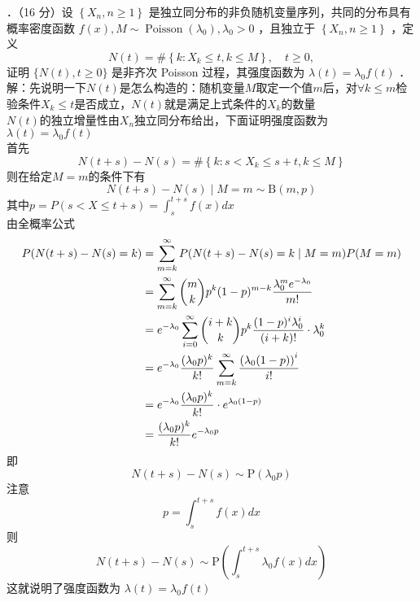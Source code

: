 \documentclass[UTF8,openany]{book}
\begin{document}
．（16 分）设 $\left\{X_{n}, n \geq 1\right\}$ 是独立同分布的非负随机变量序列，共同的分布具有概率密度函数 $f(x), M \sim \operatorname{Poisson}\left(\lambda_{0}\right), \lambda_{0}>0$ ，且独立于 $\left\{X_{n}, n \geq 1\right\}$ ，定义
$$
N(t)=\#\left\{k: X_{k} \leq t, k \leq M\right\}, \quad t \geq 0,
$$
证明 $\{N(t), t \geq 0\}$ 是非齐次 Poisson 过程，其强度函数为 $\lambda(t)=\lambda_{0} f(t)$ ．\\
解：先说明一下$N(t)$是怎么构造的：随机变量$M$取定一个值$m$后，对$\forall k \le m$检验条件$X_k \le t$是否成立，$N(t)$就是满足上式条件的$X_k$的数量\\
$N(t)$的独立增量性由$X_n$独立同分布给出，下面证明强度函数为 $\lambda(t)=\lambda_{0} f(t)$\\
首先
\[
N(t+s)-N(s)=\# \left\{k:s< X_{k} \leq s+t, k \leq M\right\}
\]
则在给定$M=m$的条件下有
\[
N(t+s)-N(s) \mid M=m \sim \mathrm{B}(m,p)
\]
其中$p=P(s<X\le t+s)=\int_{s}^{t+s} f(x)dx $\\
由全概率公式
\begin{align*}
	P(N(t+s)-N(s)=k) & = \sum\limits_{m=k}^{\infty}P(N(t+s)-N(s)=k\mid M=m)P(M=m)  \\
	&= \sum\limits_{m=k}^{\infty} \dbinom{m}{k} p^k (1-p)^{m-k}\frac{\lambda_0^m e^{-\lambda_0}}{m!}\\
	&=e^{-\lambda_0}  \sum\limits_{i=0}^{\infty} \dbinom{i+k}{k} p^k \frac{(1-p)^i \lambda_0^i }{(i+k)!}\cdot \lambda_0^k\\
	&=e^{-\lambda_0} \frac{(\lambda_0 p)^k}{k!} \sum\limits_{m=k}^{\infty} \frac{\left(\lambda_0 (1-p) \right)^i }{i!}\\
	&=e^{-\lambda_0} \frac{(\lambda_0 p)^k}{k!} \cdot e^{\lambda_{0}(1-p)}\\
	&=\frac{(\lambda_0 p)^k}{k!} e^{-\lambda_0 p}
\end{align*}
即
\[
N(t+s)-N(s)\sim \mathrm{P}(\lambda_0 p)
\]
注意
\[
p=\int_{s}^{t+s} f(x)dx
\]
则
\[
N(t+s)-N(s)\sim \mathrm{P}\left( \int_{s}^{t+s} \lambda_0 f(x)dx\right) 
\]
这就说明了强度函数为 $\lambda(t)=\lambda_{0} f(t)$\\
\newpage
\end{document}
